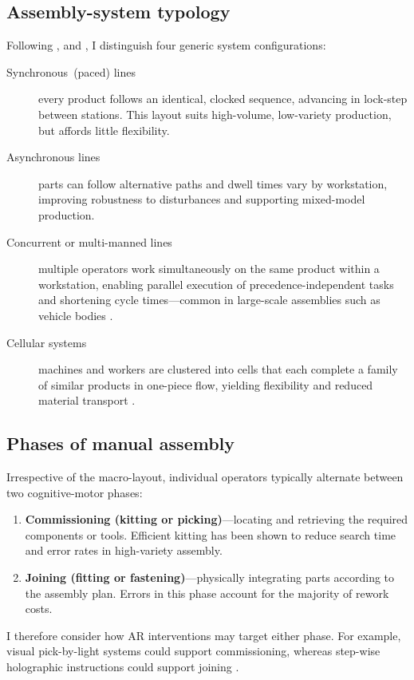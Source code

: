 \subsection{Assembly-system typology}\label{subsec:typologies}
Following \cite{hu2011assemblySystemVariety}, \cite{pilati2021multi} and \cite{greene1984review}, I distinguish four generic
system configurations:
\begin{description}
  \item[Synchronous~(paced) lines] every product follows an identical, clocked
        sequence, advancing in lock-step between stations.  This layout suits
        high-volume, low-variety production, but affords little flexibility.
  \item[Asynchronous lines] parts can follow alternative paths and dwell times
        vary by workstation, improving robustness to disturbances and
        supporting mixed-model production.
  \item[Concurrent or multi-manned lines] multiple operators work
        simultaneously on the same product within a workstation, enabling
        parallel execution of precedence-independent tasks and shortening
        cycle times—common in large-scale assemblies such as vehicle bodies
        \cite{michels2020multiManned}.
  \item[Cellular systems] machines and workers are clustered into
        cells that each complete a family of similar products in
        one-piece flow, yielding flexibility and reduced material transport
        \cite{liker2004toyota}.
\end{description}

\subsection{Phases of manual assembly}\label{subsec:phases}
Irrespective of the macro-layout, individual operators typically alternate
between two cognitive-motor phases\cite{boothroyd2010product}:
\begin{enumerate}
  \item \textbf{Commissioning (kitting or picking)}—locating and
        retrieving the required components or tools.  Efficient kitting has
        been shown to reduce search time and error rates in high-variety
        assembly\cite{wilhelm1992kitting}.
  \item \textbf{Joining (fitting or fastening)}—physically integrating
        parts according to the assembly plan.  Errors in this phase account
        for the majority of rework costs\cite{stork2010cognitionInAssembly}.
\end{enumerate}
I therefore consider how AR interventions may target either phase. For example, visual pick-by-light
systems could support commissioning, whereas step-wise holographic instructions
could support joining \cite{hanson2017augmented}\cite{dalle2021augmented}.



